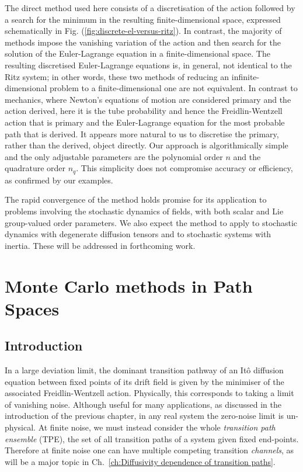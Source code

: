 The direct method used here consists of a discretisation of the action
followed by a search for the minimum in the resulting finite-dimensional
space, expressed schematically in Fig. (\ref{fig:discrete-el-versus-ritz}).
In contrast, the majority of methods impose the vanishing variation
of the action and then search for the solution of the Euler-Lagrange
equation in a finite-dimensional space. The resulting discretised
Euler-Lagrange equations is, in general, not identical to the Ritz
system; in other words, these two methods of reducing an infinite-dimensional
problem to a finite-dimensional one are not equivalent. In contrast
to mechanics, where Newton's equations of motion are considered primary
and the action derived, here it is the tube probability and hence
the Freidlin-Wentzell action that is primary and the Euler-Lagrange
equation for the most probable path that is derived. It appears more
natural to us to discretise the primary, rather than the derived,
object directly. Our approach is algorithmically simple and the only
adjustable parameters are the polynomial order $n$ and the quadrature
order $n_{q}.$ This simplicity does not compromise accuracy or efficiency,
as confirmed by our examples. 

The rapid convergence of the method holds promise for its application
to problems involving the stochastic dynamics of fields, with both
scalar and Lie group-valued order parameters. We also expect the method
to apply to stochastic dynamics with degenerate diffusion tensors
and to stochastic systems with inertia. These will be addressed in
forthcoming work.

\chapter{Monte Carlo methods in Path Spaces} \label{ch:Monte Carlo methods in Path Spaces}

\section{Introduction}

In a large deviation limit, the dominant transition pathway of an Itô diffusion equation between fixed points of its drift field is given by the minimiser of the associated Freidlin-Wentzell action. Physically, this corresponds to taking a limit of vanishing noise. Although useful for many applications, as discussed in the introduction of the previous chapter, in any real system the zero-noise limit is un-physical. At finite noise, we must instead consider the whole \textit{transition path ensemble} (TPE), the set of all transition paths of a system given fixed end-points. Therefore at finite noise one can have multiple competing transition \textit{channels}, as will be a major topic in Ch.~\ref{ch:Diffusivity dependence of transition paths}.

